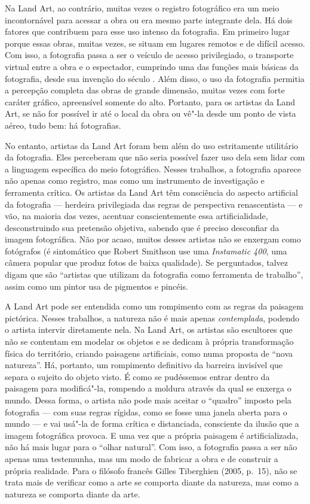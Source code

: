 Na Land Art, ao contrário, muitas vezes o registro
fotográfico era um meio incontornável para acessar a obra ou era mesmo
parte integrante dela. Há dois fatores que contribuem para esse uso
intenso da fotografia. Em primeiro lugar porque essas obras, muitas
vezes, se situam em lugares remotos e de difícil acesso. Com isso, a
fotografia passa a ser o veículo de acesso privilegiado, o transporte
virtual entre a obra e o espectador, cumprindo uma das funções mais
básicas da fotografia, desde sua invenção do século . Além disso, o
uso da fotografia permitia a percepção completa das obras de grande
dimensão, muitas vezes com forte caráter gráfico, apreensível somente
do alto. Portanto, para os artistas da Land Art, se não for
possível ir até o local da obra ou vê"-la desde um ponto de vista aéreo,
tudo bem: há fotografias.

No entanto, artistas da Land Art foram bem além do uso estritamente
utilitário da fotografia. Eles perceberam que não seria possível fazer
uso dela sem lidar com a linguagem específica do meio fotográfico.
Nesses trabalhos, a fotografia aparece não apenas como registro, mas
como um instrumento de investigação e ferramenta crítica. Os artistas da
Land Art têm consciência do aspecto artificial da fotografia --- herdeira
privilegiada das regras de perspectiva renascentista --- e vão, na
maioria das vezes, acentuar conscientemente essa artificialidade,
desconstruindo sua pretensão objetiva, sabendo que é preciso
desconfiar da imagem fotográfica. Não por acaso, muitos desses artistas
não se enxergam como fotógrafos (é sintomático que Robert Smithson use
uma \emph{Instamatic 400}, uma câmera popular que produz fotos de baixa
qualidade). Se perguntados, talvez digam que são ``artistas que utilizam
da fotografia como ferramenta de trabalho'', assim como um pintor usa de
pigmentos e pincéis.

A Land Art pode ser entendida como um rompimento com as regras da
paisagem pictórica. Nesses trabalhos, a natureza não é mais apenas
\emph{contemplada}, podendo o artista intervir diretamente nela. Na Land
Art, os artistas são escultores que não se contentam em modelar os
objetos e se dedicam à própria transformação física do território,
criando paisagens artificiais, como numa proposta de ``nova natureza''.
Há, portanto, um rompimento definitivo da barreira invisível que separa
o sujeito do objeto visto. É como se pudéssemos entrar dentro da
paisagem para modificá"-la, rompendo a moldura através da qual se enxerga
o mundo. Dessa forma, o artista não pode mais aceitar o ``quadro''
imposto pela fotografia --- com suas regras rígidas, como se fosse uma
janela aberta para o mundo --- e vai usá"-la de forma crítica e
distanciada, consciente da ilusão que a imagem fotográfica provoca. E
uma vez que a própria paisagem é artificializada, não há mais lugar para
o ``olhar natural''. Com isso, a fotografia passa a ser não apenas uma
testemunha, mas um modo de fabricar a obra e de construir a própria
realidade. Para o filósofo francês Gilles Tiberghien (2005, p.~15), não
se trata mais de verificar como a arte se comporta diante da natureza,
mas como a natureza se comporta diante da arte.


